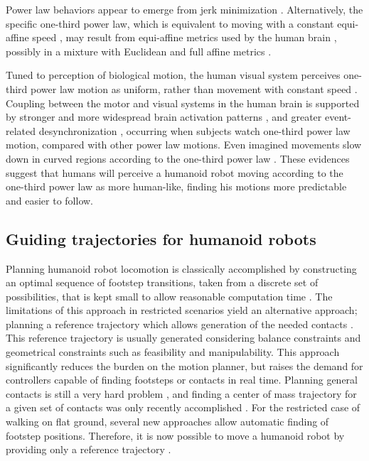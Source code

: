 Power law behaviors appear to emerge from jerk minimization \cite{huh_spectrum_2015}. Alternatively, the specific one-third power law, which is equivalent to moving with a constant equi-affine speed \cite{FlashHandzel1996}, may result from equi-affine metrics used by the human brain \cite{flash_affine_2007}, possibly in a mixture with Euclidean and full affine metrics \cite{bennequin_movement_2009}. 

Tuned to perception of biological motion, the human visual system perceives one-third power law motion as uniform, rather than movement with constant speed \cite{viviani_biological_1992}. Coupling between the motor and visual systems in the human brain is supported by stronger and more widespread brain activation patterns \cite{dayan_neural_2007}, and greater event-related desynchronization \cite{meirovitch_alpha_2015}, occurring when subjects watch one-third power law motion, compared with other power law motions.  Even imagined movements slow down in curved regions according to the one-third power law \cite{papaxanthis_relation_2012,karklinsky_timing_2015}. 
These evidences suggest that humans will perceive a humanoid robot moving according to the one-third power law as more human-like, finding his motions more predictable and easier to follow.

\subsection{Guiding trajectories for humanoid robots}
Planning humanoid robot locomotion is classically accomplished by constructing an optimal sequence of footstep transitions,
taken from a discrete set of possibilities,
that is kept small to allow reasonable computation time \cite{Chestnutt:2010:MPHR,Hornung:ICHR:12}.
The limitations of this approach in restricted scenarios yield an alternative approach; planning a reference trajectory which allows generation of the needed contacts \cite{perrin:iros:2011}.
This reference trajectory is usually generated considering balance constraints and geometrical constraints such as feasibility and manipulability. 
This approach significantly reduces the burden on the motion planner, but raises the demand for controllers capable of finding footsteps or contacts in real time.
Planning general contacts is still a very hard problem \cite{Escande:RAS:2013}, and finding a center of mass trajectory for a given set of contacts was only recently accomplished \cite{carpentier:hal-01203507}. For the restricted case of walking on flat ground, several new approaches \cite{deits:ichr:14,naveau:ral:2016,herdt:iros:2010} allow automatic finding of footstep positions. Therefore, it is now possible to move a humanoid robot by providing only a reference trajectory \cite{naveau:ral:2016, herdt:iros:2010}.

